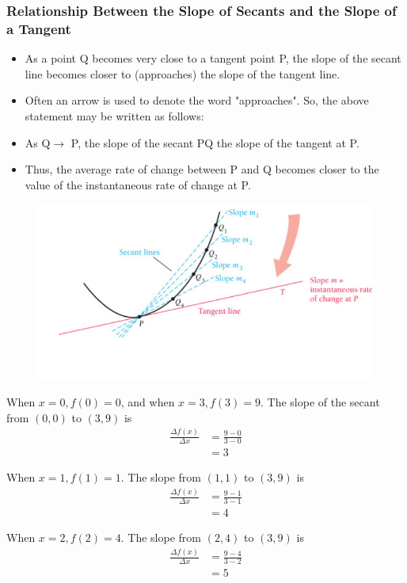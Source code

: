 \documentclass{article}
\begin{document}
\subsubsection{Relationship Between the Slope of Secants and the Slope of a Tangent}
\begin{itemize}
    \item As a point Q becomes very close to a tangent point P, the slope of the secant line becomes closer to (approaches) the slope of the tangent line.
    \item Often an arrow is used to denote the word "approaches". So, the above statement may be written as follows:
    \item As Q$\to$ P, the slope of the secant PQ the slope of the tangent at P.
    \item Thus, the average rate of change between P and Q becomes closer to the value of the instantaneous rate of change at P.
\end{itemize}
\begin{figure}[h]
    \centering
    \includegraphics[width=1\textwidth]{imgs/l5olF.png}
    \end{figure}

  When $x=0, f(0)=0$, and when $x=3, f(3)=9$. The slope of the secant from $(0,0)$ to $(3,9)$ is
$$
\begin{aligned}
\frac{\Delta f(x)}{\Delta x} & =\frac{9-0}{3-0} \\
& =3
\end{aligned}
$$

When $x=1, f(1)=1$. The slope from $(1,1)$ to $(3,9)$ is
$$
\begin{aligned}
\frac{\Delta f(x)}{\Delta x} & =\frac{9-1}{3-1} \\
& =4
\end{aligned}
$$

When $x=2, f(2)=4$. The slope from $(2,4)$ to $(3,9)$ is
$$
\begin{aligned}
\frac{\Delta f(x)}{\Delta x} & =\frac{9-4}{3-2} \\
& =5
\end{aligned}
$$  
\end{document}
